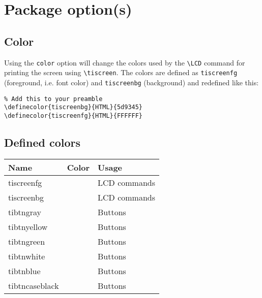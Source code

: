 \documentclass[a4paper,12pt]{article}
\begin{document}
\section{Package option(s)}

\subsection{Color} \label{sec:color}

Using the \texttt{color} option will change the colors used by the \verb|\LCD|
command for printing the screen using \verb|\tiscreen|. The colors are defined
as \texttt{tiscreenfg} (foreground, i.e. font color) and \texttt{tiscreenbg}
(background) and redefined like this:

\begin{Verbatim}
% Add this to your preamble
\definecolor{tiscreenbg}{HTML}{5d9345}
\definecolor{tiscreenfg}{HTML}{FFFFFF}
\end{Verbatim}

\subsection{Defined colors} \label{sec:colordef}

\begin{tabular}{lcl}
	Name            & Color                                                              & Usage        \\ \hline
	tiscreenfg      & {\ttfamily \color{tiscreenfg}{000000}}                             & LCD commands \\
	tiscreenbg      & {\ttfamily \color{tiscreenbg}{5d9345}}                             & LCD commands \\
	tibtngray       & {\ttfamily \color{tibtngray}{494F54}}                              & Buttons      \\
	tibtnyellow     & {\ttfamily \colorbox{tibtncaseblack}{\color{tibtnyellow}{F1E78B}}} & Buttons      \\
	tibtngreen      & {\ttfamily \colorbox{tibtncaseblack}{\color{tibtngreen}{D5DE93}}}  & Buttons      \\
	tibtnwhite      & {\ttfamily \colorbox{tibtncaseblack}{\color{tibtnwhite}{E2E2E2}}}  & Buttons      \\
	tibtnblue       & {\ttfamily \colorbox{tibtncaseblack}{\color{tibtnblue}{CDE2E9}}}   & Buttons      \\
	tibtncaseblack  & {\ttfamily \color{tibtncaseblack}{232A32}}                         & Buttons      \\
\end{tabular}
\end{document}
